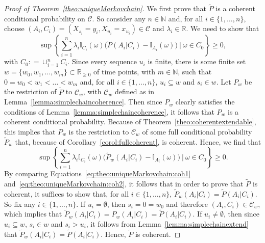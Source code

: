 \documentclass[10pt]{paper}
\theoremstyle{definition}
\newcommand{\nats}{\mathbb{N}}
\newcommand{\reals}{\mathbb{R}}
\newcommand{\ind}[1]{\mathbb{I}_{#1}}
\newcommand{\coloneqq}{:\!=}
\begin{document}
\begin{proof}[Proof of Theorem~\ref{theo:uniqueMarkovchain}]
We first prove that $\tilde{P}$ is a coherent conditional probability on $\mathcal{C}$. So consider any $n\in\nats$ and, for all $i\in\{1,\dots,n\}$, choose $(A_i,C_i)=(X_{s_i}=y_i,X_{u_i}=x_{u_i})\in\mathcal{C}$ and $\lambda_i\in\reals$. We need to show that
\begin{equation}\label{eq:theo:uniqueMarkovchain:coh1}
\sup\left\{\sum_{i=1}^n\lambda_i\ind{C_i}(\omega)\bigl(\tilde{P}(A_i\vert C_i)-\ind{A_i}(\omega)\bigr)~\Bigg\vert~\omega\in C_0\right\}\geq0,
\end{equation}
with $C_0\coloneqq\cup_{i=1}^nC_i$.
Since every sequence $u_i$ is finite, there is some finite set $w=\{w_0,w_1,\dots,w_m\}\subset\reals_{\geq0}$ of time points, with $m\in\nats$, such that $0=w_0<w_1<\dots<w_m$ and, for all $i\in\{1,\dots,n\}$, $u_i\subseteq w$ and $s_i\in w$.
Let $P_w$ be the restriction of $\tilde{P}$ to $\mathcal{C}_w$, with $\mathcal{C}_w$ defined as in Lemma~\ref{lemma:simplechaincoherence}. Then since $P_w$ clearly satisfies the conditions of Lemma~\ref{lemma:simplechaincoherence}, it follows that $P_w$ is a coherent conditional probability. Because of Theorem~\ref{theo:coherentextendable}, this implies that $P_w$ is the restriction to $\mathcal{C}_w$ of some full conditional probability $\tilde{P}_w$ that, because of Corollary~\ref{corol:fullcoherent}, is coherent. Hence, we find that
\begin{equation}\label{eq:theo:uniqueMarkovchain:coh2}
\sup\left\{\sum_{i=1}^n\lambda_i\ind{C_i}(\omega)\bigl(\tilde{P}_w(A_i\vert C_i)-\ind{A_i}(\omega)\bigr)~\Bigg\vert~\omega\in C_0\right\}\geq0.
\end{equation}
By comparing Equations~\eqref{eq:theo:uniqueMarkovchain:coh1} and~\eqref{eq:theo:uniqueMarkovchain:coh2}, it follows that in order to prove that $\tilde{P}$ is coherent, it suffices to show that, for all $i\in\{1,\dots,n\}$, $\tilde{P}_w(A_i\vert C_i)=\tilde{P}(A_i\vert C_i)$. So fix any $i\in\{1,\dots,n\}$. If $u_i=\emptyset$, then $s_i=0=w_0$ and therefore $(A_i,C_i)\in\mathcal{C}_w$, which implies that $\tilde{P}_w(A_i\vert C_i)=P_w(A_i\vert C_i)=\tilde{P}(A_i\vert C_i)$. If $u_i\neq\emptyset$, then since $u_i\subseteq w$, $s_i\in w$ and $s_i>u_i$, it follows from Lemma~\ref{lemma:simplechainextend} that $\tilde{P}_w(A_i\vert C_i)=\tilde{P}(A_i\vert C_i)$. Hence, $\tilde{P}$ is coherent.




\end{proof}
\end{document}
